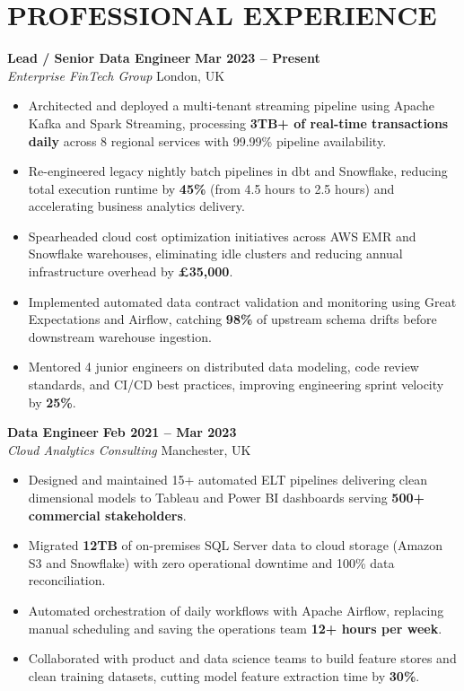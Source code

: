 \documentclass[11pt,a4paper]{article}
\begin{document}
\section*{PROFESSIONAL EXPERIENCE}

\textbf{Lead / Senior Data Engineer} \hfill \textbf{Mar 2023 -- Present} \\
\textit{Enterprise FinTech Group} \hfill London, UK
\begin{itemize}
    \item Architected and deployed a multi-tenant streaming pipeline using Apache Kafka and Spark Streaming, processing \textbf{3TB+ of real-time transactions daily} across 8 regional services with 99.99\% pipeline availability.
    \item Re-engineered legacy nightly batch pipelines in dbt and Snowflake, reducing total execution runtime by \textbf{45\%} (from 4.5 hours to 2.5 hours) and accelerating business analytics delivery.
    \item Spearheaded cloud cost optimization initiatives across AWS EMR and Snowflake warehouses, eliminating idle clusters and reducing annual infrastructure overhead by \textbf{\pounds35,000}.
    \item Implemented automated data contract validation and monitoring using Great Expectations and Airflow, catching \textbf{98\%} of upstream schema drifts before downstream warehouse ingestion.
    \item Mentored 4 junior engineers on distributed data modeling, code review standards, and CI/CD best practices, improving engineering sprint velocity by \textbf{25\%}.
\end{itemize}
\vspace{8pt}

\textbf{Data Engineer} \hfill \textbf{Feb 2021 -- Mar 2023} \\
\textit{Cloud Analytics Consulting} \hfill Manchester, UK
\begin{itemize}
    \item Designed and maintained 15+ automated ELT pipelines delivering clean dimensional models to Tableau and Power BI dashboards serving \textbf{500+ commercial stakeholders}.
    \item Migrated \textbf{12TB} of on-premises SQL Server data to cloud storage (Amazon S3 and Snowflake) with zero operational downtime and 100\% data reconciliation.
    \item Automated orchestration of daily workflows with Apache Airflow, replacing manual scheduling and saving the operations team \textbf{12+ hours per week}.
    \item Collaborated with product and data science teams to build feature stores and clean training datasets, cutting model feature extraction time by \textbf{30\%}.
\end{itemize}
\end{document}
